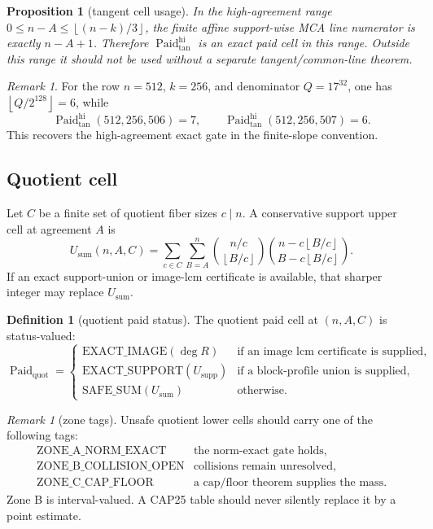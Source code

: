 \documentclass[11pt]{article}
\newtheorem{proposition}[theorem]{Proposition}
\theoremstyle{definition}
\newtheorem{definition}[theorem]{Definition}
\theoremstyle{remark}
\newtheorem{remark}[theorem]{Remark}
\newcommand{\Paid}{\operatorname{Paid}}
\newcommand{\floor}[1]{\left\lfloor #1\right\rfloor}
\begin{document}
\begin{proposition}[tangent cell usage]\label{prop:tangent}
In the high-agreement range $0\le n-A\le\floor{(n-k)/3}$, the finite affine
support-wise MCA line numerator is exactly $n-A+1$.  Therefore
$\Paid_{\tan}^{\mathrm{hi}}$ is an exact paid cell in this range.  Outside this
range it should not be used without a separate tangent/common-line theorem.
\end{proposition}

\begin{remark}
For the row $n=512$, $k=256$, and denominator $Q=17^{32}$, one has
$\floor{Q/2^{128}}=6$, while
\[
        \Paid_{\tan}^{\mathrm{hi}}(512,256,506)=7,\qquad
        \Paid_{\tan}^{\mathrm{hi}}(512,256,507)=6.
\]
This recovers the high-agreement exact gate in the finite-slope convention.
\end{remark}

\subsection{Quotient cell}

Let $C$ be a finite set of quotient fiber sizes $c\mid n$.  A conservative
support upper cell at agreement $A$ is
\[
U_{\mathrm{sum}}(n,A,C)=
\sum_{c\in C}\sum_{B=A}^{n}
\binom{n/c}{\floor{B/c}}
\binom{n-c\floor{B/c}}{B-c\floor{B/c}}.
\]
If an exact support-union or image-lcm certificate is available, that sharper
integer may replace $U_{\mathrm{sum}}$.

\begin{definition}[quotient paid status]
The quotient paid cell at $(n,A,C)$ is status-valued:
\[
\Paid_{\mathrm{quot}}=
\begin{cases}
\mathrm{EXACT\_IMAGE}(\deg R) & \text{if an image lcm certificate is supplied},\\
\mathrm{EXACT\_SUPPORT}(U_{\mathrm{supp}}) & \text{if a block-profile union is supplied},\\
\mathrm{SAFE\_SUM}(U_{\mathrm{sum}}) & \text{otherwise}.
\end{cases}
\]
\end{definition}

\begin{remark}[zone tags]
Unsafe quotient lower cells should carry one of the following tags:
\[
\begin{array}{ll}
\mathrm{ZONE\_A\_NORM\_EXACT} & \text{the norm-exact gate holds},\\
\mathrm{ZONE\_B\_COLLISION\_OPEN} & \text{collisions remain unresolved},\\
\mathrm{ZONE\_C\_CAP\_FLOOR} & \text{a cap/floor theorem supplies the mass}.
\end{array}
\]
Zone B is interval-valued.  A CAP25 table should never silently replace it by a
point estimate.
\end{remark}
\end{document}
